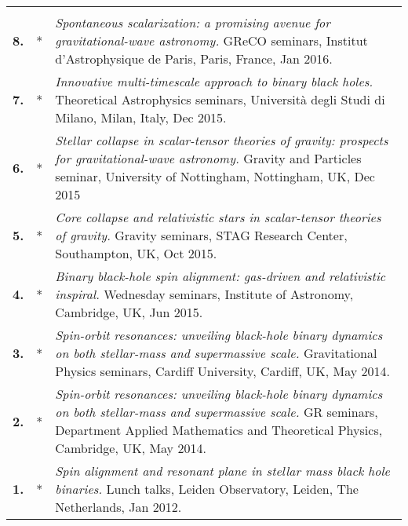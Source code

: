 \documentclass[11pt,letterpaper,sans]{moderncv}   %
\begin{document}
{\begin{longtable}{rp{0.4cm}p{15.8cm}}
\vspace{0.05cm}\\
\textbf{8.} & *& \textit{Spontaneous scalarization: a promising avenue for gravitational-wave astronomy.}
\newline{} 
GReCO seminars, Institut d'Astrophysique de Paris, Paris, France, Jan 2016.
\vspace{0.05cm}\\
\textbf{7.} & *& \textit{Innovative multi-timescale approach to binary black holes.}
\newline{} 
Theoretical Astrophysics seminars, Università degli Studi di Milano, Milan, Italy, Dec 2015.
\vspace{0.05cm}\\
\textbf{6.} & *& \textit{Stellar collapse in scalar-tensor theories of gravity: prospects for gravitational-wave astronomy.}
\newline{} 
Gravity and Particles seminar, University of Nottingham, Nottingham, UK, Dec 2015
\vspace{0.05cm}\\
\textbf{5.} & *& \textit{Core collapse and relativistic stars in scalar-tensor theories of gravity.}
\newline{} 
Gravity seminars, STAG Research Center, Southampton, UK, Oct 2015.
\vspace{0.05cm}\\
\textbf{4.} & *& \textit{Binary black-hole spin alignment: gas-driven and relativistic inspiral.}
\newline{} 
Wednesday seminars, Institute of Astronomy, Cambridge, UK, Jun 2015.\vspace{0.05cm}\\
\textbf{3.} & *& \textit{Spin-orbit resonances: unveiling black-hole binary dynamics on both stellar-mass and supermassive scale.}
\newline{} 
Gravitational Physics seminars, Cardiff University, Cardiff, UK, May 2014.
\vspace{0.05cm}\\
\textbf{2.} & *& \textit{Spin-orbit resonances: unveiling black-hole binary dynamics on both stellar-mass and supermassive scale.}
\newline{} 
GR seminars, Department Applied Mathematics and Theoretical Physics, Cambridge, UK, May 2014.
\vspace{0.05cm}\\
\textbf{1.} & *& \textit{Spin alignment and resonant plane in stellar mass black hole binaries.}
\newline{} 
Lunch talks, Leiden Observatory, Leiden, The Netherlands, Jan 2012.
\vspace{0.05cm}\\
\end{longtable}
}
\end{document}
